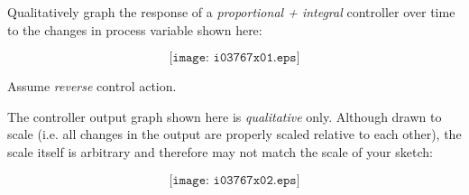 

Qualitatively graph the response of a {\it proportional + integral} controller over time to the changes in process variable shown here:

$$\texttt{[image: i03767x01.eps]}$$

Assume {\it reverse} control action.







The controller output graph shown here is {\it qualitative} only.  Although drawn to scale (i.e. all changes in the output are properly scaled relative to each other), the scale itself is arbitrary and therefore may not match the scale of your sketch:

$$\texttt{[image: i03767x02.eps]}$$










